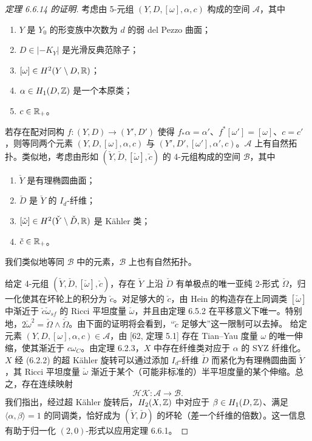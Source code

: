 \begin{proof}[定理 6.6.14 的证明]
考虑由 5-元组 $(Y,D,[\omega],\alpha,c)$ 构成的空间 $\mathcal{A}$，其中
\begin{enumerate}
\item $Y$ 是 $Y_0$ 的形变族中次数为 $d$ 的弱 del Pezzo 曲面；
\item $D\in|-K_Y|$ 是光滑反典范除子；
\item $[\omega]\in H^2(Y\setminus D,\mathbb{R})$；
\item $\alpha\in H_1(D,\mathbb{Z})$ 是一个本原类；
\item $c\in\mathbb{R}_+$。
\end{enumerate}
若存在配对同构 $f:(Y,D)\to(Y',D')$ 使得 $f_*\alpha=\alpha'$、$f^*[\omega']=[\omega]$、$c=c'$，则等同两个元素 $(Y,D,[\omega],\alpha,c)$ 与 $(Y',D',[\omega'],\alpha',c)$。$\mathcal{A}$ 上有自然拓扑。类似地，考虑由形如 $(\check Y,\check D,[\check\omega],\check c)$ 的 4-元组构成的空间 $\mathcal{B}$，其中
\begin{enumerate}
\item $\check Y$ 是有理椭圆曲面；
\item $\check D$ 是 $\check Y$ 的 $I_d$-纤维；
\item $[\check\omega]\in H^2(\check Y\setminus\check D,\mathbb{R})$ 是 Kähler 类；
\item $\check c\in\mathbb{R}_+$。
\end{enumerate}
我们类似地等同 $\mathcal{B}$ 中的元素，$\mathcal{B}$ 上也有自然拓扑。

给定 4-元组 $(\check Y,\check D,[\check\omega],\check c)$，存在 $\check Y$ 上沿 $\check D$ 有单极点的唯一亚纯 2-形式 $\check\Omega$，归一化使其在坏轮上的积分为 $\check c$。对足够大的 $\check c$，由 Hein 的构造存在上同调类 $[\check\omega]$ 中渐近于 $\check c\check\omega_{sf}$ 的 Ricci 平坦度量 $\check\omega$，并且由定理 6.5.2 在平移意义下唯一。特别地，$2\check\omega^2=\check\Omega\wedge\bar{\check\Omega}$。由下面的证明将会看到，“$\check c$ 足够大”这一限制可以去掉。
给定元素 $(Y,D,[\omega],\alpha,c)\in\mathcal{A}$，由 [62, 定理 5.1] 存在 Tian--Yau 度量 $\omega$ 的唯一伸缩，使其渐近于 $c\omega_C$。由定理 6.2.3，$X$ 中存在纤维类对应于 $\alpha$ 的 SYZ 纤维化。$X$ 经 (6.2.2) 的超 Kähler 旋转可以通过添加 $I_d$-纤维 $\check D$ 而紧化为有理椭圆曲面 $\check Y$，其 Ricci 平坦度量 $\check\omega$ 渐近于某个（可能非标准的）半平坦度量的某个伸缩。总之，存在连续映射
\[
\mathcal{HK}:\mathcal{A}\to\mathcal{B}.
\]
我们指出，经过超 Kähler 旋转后，$H_2(X,\mathbb{Z})$ 中对应于 $\beta\in H_1(D,\mathbb{Z})$、满足 $\langle\alpha,\beta\rangle=1$ 的同调类，恰好成为 $(\check Y,\check D)$ 的坏轮（差一个纤维的倍数）。这一信息有助于归一化 $(2,0)$-形式以应用定理 6.6.1。


\end{proof}
